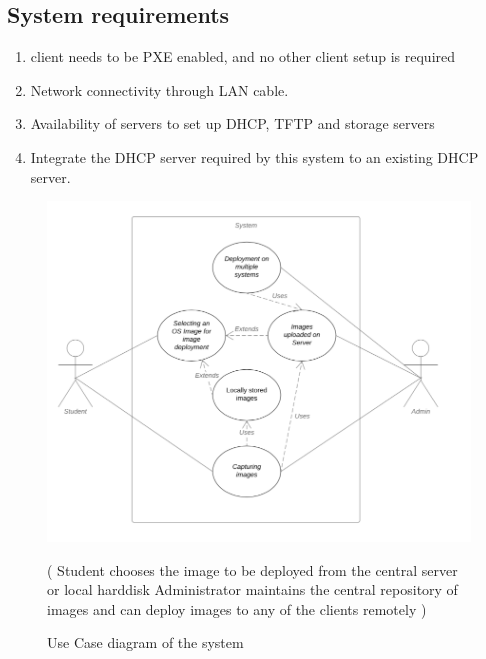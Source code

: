 \documentclass[a4paper,12pt]{article}
\begin{document}
\subsection{System requirements}
\begin{enumerate}
\item client needs to be PXE enabled, and no other client setup is required
\item Network connectivity through LAN cable.
\item Availability of servers to set up DHCP, TFTP and storage servers
\item Integrate the DHCP server required by this system to an existing DHCP server.
\end{enumerate}
\begin{figure}[h!]
    \centering
    \includegraphics[width=\linewidth]{i1.png}
    \caption{Use Case diagram of the system}
    \label{fig:Use case}
    \small
    ( Student chooses the image to be deployed from the central server or local harddisk
    Administrator maintains the central repository of images and can deploy
    images to any of the clients remotely )
\end{figure}
\end{document}
